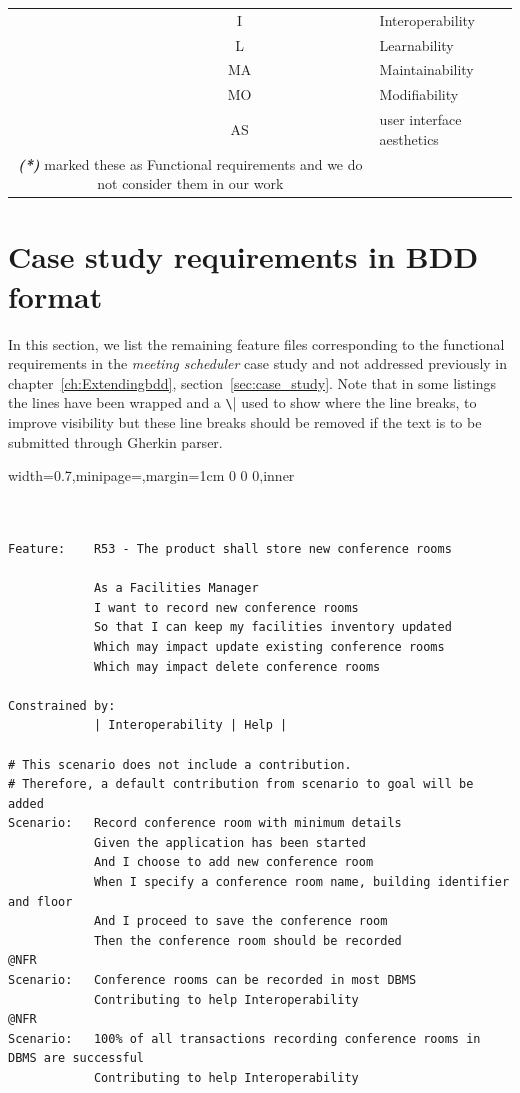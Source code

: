 \documentclass[dissertation,final]{softeng}
\newenvironment{featurecode}[1]
{ \lrbox\featurebox \begin{adjustbox}{width=#1\textwidth,minipage=\textwidth,margin=1cm 0 0 0,inner} }
{ \end{adjustbox}\endlrbox}
\newenvironment{featurelist}[2]
{
\newcommand{\setcaption}{\caption{#1}}
\newcommand{\setlabel}{\label{#2}}
}
{\begin{listing}[h!]\centering\usebox\featurebox\setcaption\setlabel\end{listing}}
\begin{document}
\begin{appendices}
{\begin{table}[h!]
{{\begin{tabular}{c c l}
                & I	 & Interoperability \\
                & L	 & Learnability \\
                & MA & Maintainability \\
                & MO & Modifiability \\
                & AS & user interface aesthetics \\
                \multicolumn{2}{c}{\multirow{3}[1]{*}{\emph{\bfseries{(*)}} \citet{MylopoulosOnt2014} marked these as Functional requirements and we do not consider them in our work}} 
            \end{tabular}
        }
  }
\end{table}
}

\clearpage
\section{Case study requirements in BDD format}

In this section, we list the remaining feature files corresponding to the functional requirements in the \emph{meeting scheduler} case study and not addressed previously in chapter~\ref{ch:Extendingbdd}, section~\ref{sec:case_study}.
Note that in some listings the lines have been wrapped and a \verb|\|| used to show where the line breaks, to improve visibility but these line breaks should be removed if the text is to be submitted through Gherkin parser.

\begin{featurelist}{R53 -- The product shall store new conference rooms}{lst:feature_r53}
\begin{featurecode}{0.7}
\begin{verbatim}


Feature:    R53 - The product shall store new conference rooms
	
            As a Facilities Manager
            I want to record new conference rooms
            So that I can keep my facilities inventory updated
            Which may impact update existing conference rooms
            Which may impact delete conference rooms
			
Constrained by:
            | Interoperability | Help |

# This scenario does not include a contribution.
# Therefore, a default contribution from scenario to goal will be added
Scenario:   Record conference room with minimum details
            Given the application has been started
            And I choose to add new conference room
            When I specify a conference room name, building identifier and floor
            And I proceed to save the conference room
            Then the conference room should be recorded
@NFR	
Scenario:   Conference rooms can be recorded in most DBMS
            Contributing to help Interoperability
@NFR
Scenario:   100% of all transactions recording conference rooms in DBMS are successful
            Contributing to help Interoperability
\end{verbatim}
\end{featurecode}
\end{featurelist}


\end{appendices}
\end{document}

